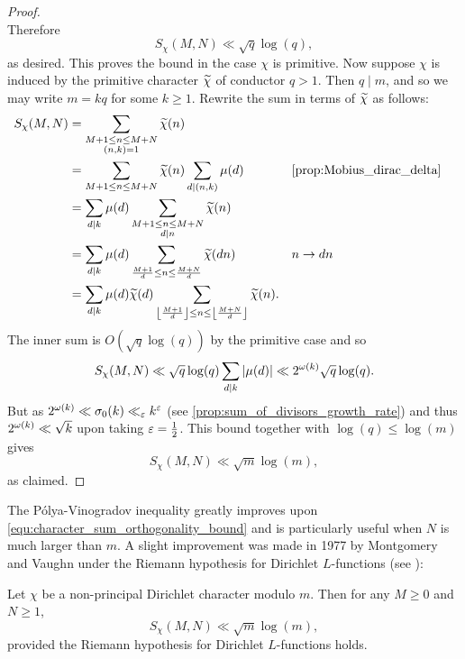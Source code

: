 \begin{proof}
\[      \]
      Therefore
      \[
        S_{\chi}(M,N) \ll \sqrt{q}\log(q),
      \]
      as desired. This proves the bound in the case $\chi$ is primitive. Now suppose $\chi$ is induced by the primitive character $\widetilde{\chi}$ of conductor $q > 1$. Then $q \mid m$, and so we may write $m = kq$ for some $k \ge 1$. Rewrite the sum in terms of $\widetilde{\chi}$ as follows:
      \begin{align*}
        S_{\chi}(M,N) &= \sum_{\substack{M+1 \le n \le M+N \\ (n,k) = 1}}\wtilde{\chi}(n) \\
        &= \sum_{M+1 \le n \le M+N}\wtilde{\chi}(n)\sum_{d \mid (n,k)}\mu(d) && \text{\cref{prop:Mobius_dirac_delta}} \\
        &= \sum_{d \mid k}\mu(d)\sum_{\substack{M+1 \le n \le M+N \\ d \mid n}}\wtilde{\chi}(n) \\
        &= \sum_{d \mid k}\mu(d)\sum_{\frac{M+1}{d} \le n \le \frac{M+N}{d}}\wtilde{\chi}(dn) && \text{$n \to dn$} \\
        &= \sum_{d \mid k}\mu(d)\wtilde{\chi}(d)\sum_{\left\lfloor\frac{M+1}{d}\right\rfloor \le n \le \left\lfloor\frac{M+N}{d}\right\rfloor}\wtilde{\chi}(n).
      \end{align*}
      The inner sum is $O(\sqrt{q}\log(q))$ by the primitive case and so
      \[
        S_{\chi}(M,N) \ll \sqrt{q}\log(q)\sum_{d \mid k}|\mu(d)| \ll 2^{\omega(k)}\sqrt{q}\log(q).
      \]
      But as $2^{\omega(k)} \ll \sigma_{0}(k) \ll_{\varepsilon} k^{\varepsilon}$ (see \cref{prop:sum_of_divisors_growth_rate}) and thus $2^{\omega(k)} \ll \sqrt{k}$ upon taking $\varepsilon = \frac{1}{2}$. This bound together with $\log(q) \le \log(m)$ gives
      \[
        S_{\chi}(M,N) \ll \sqrt{m}\log(m),
      \]
      as claimed.
    \end{proof}

    The P\'olya-Vinogradov inequality greatly improves upon \cref{equ:character_sum_orthogonality_bound} and is particularly useful when $N$ is much larger than $m$. A slight improvement was made in 1977 by Montgomery and Vaughn under the Riemann hypothesis for Dirichlet $L$-functions (see \cite{montgomery1977exponential}):

    \begin{theorem}\label{thm:MV_bound_character_sum}
      Let $\chi$ be a non-principal Dirichlet character modulo $m$. Then for any $M \ge 0$ and $N \ge 1$,
      \[
        S_{\chi}(M,N) \ll \sqrt{m}\log(m),
      \]
      provided the Riemann hypothesis for Dirichlet $L$-functions holds.
    \end{theorem}
    
